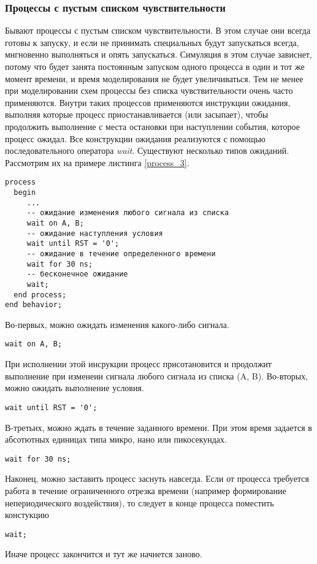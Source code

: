 \subsubsection{Процессы с пустым списком чувствительности}

Бывают процессы с пустым списком чувствительности. В этом случае они всегда готовы к запуску, и если не принимать специальных будут запускаться всегда, мнгновенно выполняться и опять запускаться. Симуляция в этом случае зависнет, потому что будет занята постоянным запуском одного процесса в один и тот же момент времени, и время моделирования не будет увеличиваться. Тем не менее при моделировании схем процессы без списка чувствительности очень часто применяются. Внутри таких процессов применяются инструкции ожидания, выполняя которые процесс приостанавливается (или засыпает), чтобы продолжить выполнение с места остановки при наступлении события, которое процесс ожидал.
Все конструкции ожидания реализуются с помощью последовательного оператора \emph{wait}. Существуют несколько типов ожиданий. Рассмотрим их на примере листинга \ref{process_3}.

\begin{Code}
\begin{lstlisting}[caption=Процесс с пустым списком чувствительности и оператором \emph{wait}, label=process_3]
  process
  begin
     ...
     -- ожидание изменения любого сигнала из списка
     wait on A, B;
     -- ожидание наступления условия
     wait until RST = '0';
     -- ожидание в течение определенного времени
     wait for 30 ns;
     -- бесконечное ожидание
     wait;
  end process;
end behavior;
\end{lstlisting}
\end{Code}

Во-первых, можно ожидать изменения какого-либо сигнала.
\begin{lstlisting}
wait on A, B;
\end{lstlisting}
При исполнении этой инсрукции процесс присотановится и продолжит выполнение при изменеии сигнала любого сигнала из списка (A, B). Во-вторых, можно ожидать выполнение условия.
\begin{lstlisting}
wait until RST = '0';
\end{lstlisting}
В-третьих, можно ждать в течение заданного времени. При этом время задается в абсотютных единицах типа микро, нано или пикосекундах.
\begin{lstlisting}
wait for 30 ns;
\end{lstlisting}
Наконец, можно заставить процесс заснуть навсегда. Если от процесса требуется работа в течение ограниченного отрезка времени (например формирование непериодического воздействия), то следует в конце процесса поместить констукцию
\begin{lstlisting}
wait;
\end{lstlisting}
Иначе процесс закончится и тут же начнется заново.

